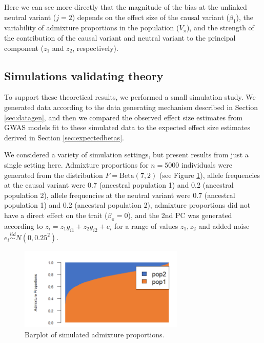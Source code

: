 \documentclass[12pt]{article}
\begin{document}
Here we can see more directly that the magnitude of the bias at the unlinked neutral variant ($j = 2$) depends on the effect size of the causal variant ($\beta_1$), the variability of admixture proportions in the population ($V_\pi$), and the strength of the contribution of the causal variant and neutral variant to the principal component ($z_1$ and $z_2$, respectively).

%


\subsection{Simulations validating theory}

To support these theoretical results, we performed a small simulation study. We generated data according to the data generating mechanism described in Section \ref{sec:datagen}, and then we compared the observed effect size estimates from GWAS models fit to these simulated data to the expected effect size estimates derived in Section \ref{sec:expectedbetas}. 

We considered a variety of simulation settings, but present results from just a single setting here. 
Admixture proportions for $n = 5000$ individuals were generated from the distribution $F = \text{Beta}(7,2)$ (see Figure \ref{fig:barplot}), 
allele frequencies at the causal variant were 0.7 (ancestral population 1) and 0.2 (ancestral population 2), 
allele frequencies at the neutral variant were 0.7 (ancestral population 1) and 0.2 (ancestral population 2), 
admixture proportions did not have a direct effect on the trait ($\beta_\pi = 0$), and 
the 2nd PC was generated according to $z_i = z_1 g_{i1} + z_2 g_{i2} + e_i$ for a range of values $z_1, z_2$ and added noise $e_i \overset{iid}{\sim} N(0, 0.25^2)$.  

\begin{figure}[!htb]
\centering
\includegraphics[width=0.7\textwidth]{figs/finalfigs/figS7_sims_barplot}
\caption{Barplot of simulated admixture proportions.}
\label{fig:barplot}
\end{figure}
\end{document}
